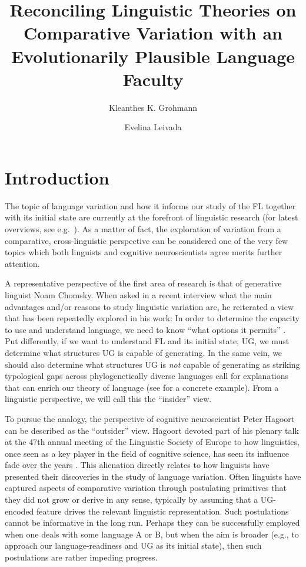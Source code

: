 \documentclass[output=paper]{langsci/langscibook}
\author{Kleanthes K. Grohmann\affiliation{University of Cyprus, Cyprus
Acquisition Team}\and Evelina Leivada\affiliation{UiT The Arctic University of
Norway, Cyprus Acquisition Team}}
\title{Reconciling Linguistic
Theories on Comparative Variation with an Evolutionarily Plausible Language
Faculty}
\begin{document}
\glsresetall


\section{Introduction}

The topic of language variation and how it informs our study of the \gls{FL}
together with its initial state are currently at the forefront of linguistic
research (for latest overviews, see e.g.\
\citealt{Hinzen2014,Trettenbrein2015,BerwickChomsky2016}). As a matter of fact,
the exploration of variation from a comparative, cross-linguistic perspective
can be considered one of the very few topics which both linguists and cognitive
neuroscientists agree merits further attention.

A representative perspective of the first area of research is that of
generative linguist Noam Chomsky. When asked in a recent interview what the
main advantages and/or reasons to study linguistic variation are, he reiterated
a view that has been repeatedly explored in his work: In order to determine the
capacity to use and understand language, we need to know \enquote{what options
it permits} \citep{Chomsky2015b}. Put differently, if we want to understand
\gls{FL} and its initial state, \gls{UG}, we must determine what structures
\gls{UG} is capable of generating. In the same vein, we should also determine
what structures \gls{UG}\is{Universal Grammar} is \emph{not} capable of generating as striking
typological gaps across phylogenetically diverse languages call for
explanations that can enrich our theory of language (see
\citealt{BibHolRob2014} for a concrete example). From a linguistic perspective,
we will call this the \enquote{insider} view.

To pursue the analogy, the perspective of cognitive neuroscientist Peter
Hagoort can be described as the \enquote{outsider} view. Hagoort devoted part
of his plenary talk at the 47th annual meeting of the Linguistic Society of
Europe to how linguistics, once seen as a key player in the field of cognitive
science, has seen its influence fade over the years \citep{Hagoort2014}. This
alienation directly relates to how linguists have presented their discoveries
in the study of language variation. Often linguists have captured aspects of
comparative variation through postulating primitives that they did not grow or
derive in any sense, typically by assuming that a \gls{UG}-encoded feature
drives the relevant linguistic representation. Such postulations cannot be
informative in the long run. Perhaps they can be successfully employed when one
deals with some language A or B, but when the aim is broader (e.g., to approach
our language-readiness and \gls{UG}\is{Universal Grammar} as its initial
state), then such postulations are rather impeding progress.
\end{document}
